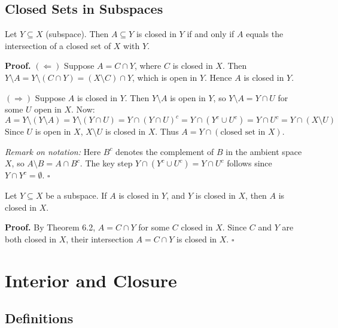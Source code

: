 \documentclass[11pt]{report}
\renewenvironment{proof}[1][Proof]{\noindent\textbf{#1.} }{\hfill$\square$\par\vspace{5pt}}
\begin{document}
\subsection{Closed Sets in Subspaces}

\begin{thmbox}
Let $Y \subseteq X$ (subspace). Then $A \subseteq Y$ is closed in $Y$ if and only if $A$ equals the intersection of a closed set of $X$ with $Y$.
\end{thmbox}

\begin{proof}
$(\Leftarrow)$ Suppose $A = C \cap Y$, where $C$ is closed in $X$. Then $Y \setminus A = Y \setminus (C \cap Y) = (X \setminus C) \cap Y$, which is open in $Y$. Hence $A$ is closed in $Y$.

$(\Rightarrow)$ Suppose $A$ is closed in $Y$. Then $Y \setminus A$ is open in $Y$, so $Y \setminus A = Y \cap U$ for some $U$ open in $X$. Now:
\[A = Y \setminus (Y \setminus A) = Y \setminus (Y \cap U) = Y \cap (Y \cap U)^c = Y \cap (Y^c \cup U^c) = Y \cap U^c = Y \cap (X \setminus U)\]
Since $U$ is open in $X$, $X \setminus U$ is closed in $X$. Thus $A = Y \cap (\text{closed set in } X)$.

\textit{Remark on notation:} Here $B^c$ denotes the complement of $B$ in the ambient space $X$, so $A \setminus B = A \cap B^c$. The key step $Y \cap (Y^c \cup U^c) = Y \cap U^c$ follows since $Y \cap Y^c = \emptyset$.
\end{proof}

\begin{thmbox}
Let $Y \subseteq X$ be a subspace. If $A$ is closed in $Y$, and $Y$ is closed in $X$, then $A$ is closed in $X$.
\end{thmbox}

\begin{proof}
By Theorem 6.2, $A = C \cap Y$ for some $C$ closed in $X$. Since $C$ and $Y$ are both closed in $X$, their intersection $A = C \cap Y$ is closed in $X$.
\end{proof}

\section{Interior and Closure}

\subsection{Definitions}
\end{document}
